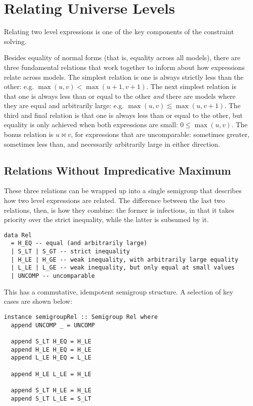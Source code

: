 \documentclass[11pt, twoside, reqno]{book}
\begin{document}
\section{Relating Universe Levels}
\label{rel-uni-lvl}

Relating two level expressions is one of the key components of the constraint solving.

Besides equality of normal forms (that is, equality across all models), there are three fundamental relations that work together to inform about how expressions relate across models.
The simplest relation is one is always strictly less than the other: e.g. \(\max(u,v) < \max(u+1,v+1)\).
The next simplest relation is that one is always less than or equal to the other \emph{and} there are models where they are equal and arbitrarily large: e.g. \(\max(u,v) \lesssim \max(u,v+1)\).
The third and final relation is that one is always less than or equal to the other, but equality is only achieved when both expressions are small: \(0 \leqslant \max(u,v)\).
The bonus relation is \(u \bowtie v\), for expressions that are uncomparable: sometimes greater, sometimes less than, and necessarily arbitrarily large in either direction.

\subsection{Relations Without Impredicative Maximum}

These three relations can be wrapped up into a single semigroup that describes how two level expressions are related.
The difference between the last two relations, then, is how they combine: the former is infectious, in that it takes priority over the strict inequality, while the latter is subsumed by it.

\begin{verbatim}
data Rel
  = H_EQ -- equal (and arbitrarily large)
  | S_LT | S_GT -- strict inequality
  | H_LE | H_GE -- weak inequality, with arbitrarily large equality
  | L_LE | L_GE -- weak inequality, but only equal at small values
  | UNCOMP -- uncomparable
\end{verbatim}

This has a commutative, idempotent semigroup structure.
A selection of key cases are shown below:
\begin{verbatim}
instance semigroupRel :: Semigroup Rel where
  append UNCOMP _ = UNCOMP

  append S_LT H_EQ = H_LE
  append H_LE H_EQ = H_LE
  append L_LE H_EQ = L_LE

  append H_LE L_LE = H_LE

  append S_LT H_LE = H_LE
  append S_LT L_LE = S_LT
\end{verbatim}
\end{document}
